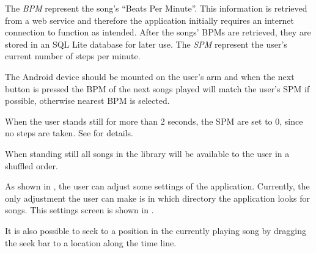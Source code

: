 The \textit{BPM} represent the song's ``Beats Per Minute''. This information is retrieved from a web service and therefore the application initially requires an internet connection to function as intended. After the songs' BPMs are retrieved, they are stored in an SQL Lite database for later use. The \textit{SPM} represent the user's current number of steps per minute.

The Android device should be mounted on the user's arm and when the next button is pressed the BPM of the next songs played will match the user's SPM if possible, otherwise nearest BPM is selected.

When the user stands still for more than 2 seconds, the SPM are set to 0, since no steps are taken. See  for details. 

When standing still all songs in the library will be available to the user in a shuffled order. 

As shown in , the user can adjust some settings of the application. Currently, the only adjustment the user can make is in which directory the application looks for songs. This settings screen is shown in . 

It is also possible to seek to a position in the currently playing song by dragging the seek bar to a location along the time line. 



